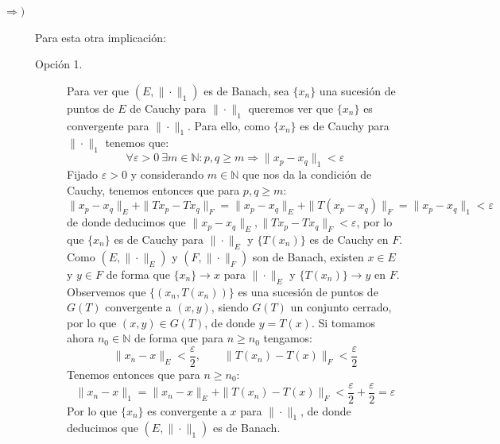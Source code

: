 \documentclass[12pt]{article}
\begin{document}
\begin{ejercicio}[3.5 Puntos]
\begin{description}
            \item [$\Longrightarrow )$] Para esta otra implicación:
                \begin{description}
                    \item [Opción 1.] Para ver que $(E,\|\cdot \|_1)$ es de Banach, sea $\{x_n\}$ una sucesión de puntos de $E$ de Cauchy para $\|\cdot \|_1$ queremos ver que $\{x_n\}$ es convergente para $\|\cdot \|_1$. Para ello, como $\{x_n\}$ es de Cauchy para $\|\cdot \|_1$ tenemos que:
                        \begin{equation*}
                            \forall \varepsilon>0~\exists m\in \mathbb{N}:p,q\geq m \Longrightarrow \|x_p-x_q\|_1 < \varepsilon
                        \end{equation*}
                        Fijado $\varepsilon>0$ y considerando $m\in \mathbb{N}$ que nos da la condición de Cauchy, tenemos entonces que para $p,q\geq m$:
                        \begin{equation*}
                            \|x_p-x_q\|_E + \|Tx_p - Tx_q\|_F = \|x_p-x_q\|_E + \|T(x_p-x_q)\|_F = \|x_p - x_q\|_1 < \varepsilon
                        \end{equation*}
                        de donde deducimos que $\|x_p-x_q\|_E, \|Tx_p - Tx_q\|_F< \varepsilon$, por lo que $\{x_n\}$ es de Cauchy para $\|\cdot \|_E$ y $\{T(x_n)\}$ es de Cauchy en $F$. Como $(E,\|\cdot \|_E)$ y $(F,\|\cdot \|_F)$ son de Banach, existen $x\in E$ y $y\in F$ de forma que $\{x_n\}\to x$ para $\|\cdot \|_E$ y $\{T(x_n)\}\to y$ en $F$. Observemos que $\{(x_n,T(x_n))\}$ es una sucesión de puntos de $G(T)$ convergente a $(x,y)$, siendo $G(T)$ un conjunto cerrado, por lo que $(x,y)\in G(T)$, de donde $y = T(x)$. Si tomamos ahora $n_0\in \mathbb{N}$ de forma que para $n\geq n_0$ tengamos:
                        \begin{equation*}
                            \|x_n - x\|_E < \frac{\varepsilon}{2},\qquad \|T(x_n) - T(x)\|_F < \frac{\varepsilon}{2}
                        \end{equation*}
                        Tenemos entonces que para $n\geq  n_0$:
                        \begin{equation*}
                            \|x_n - x\|_1 = \|x_n - x\|_E + \|T(x_n) - T(x)\|_F < \frac{\varepsilon}{2} + \frac{\varepsilon}{2} = \varepsilon
                        \end{equation*}
                        Por lo que $\{x_n\}$ es convergente a $x$ para $\|\cdot \|_1$, de donde deducimos que $(E,\|\cdot \|_1)$ es de Banach.

\end{description}
\end{description}
\end{ejercicio}
\end{document}
